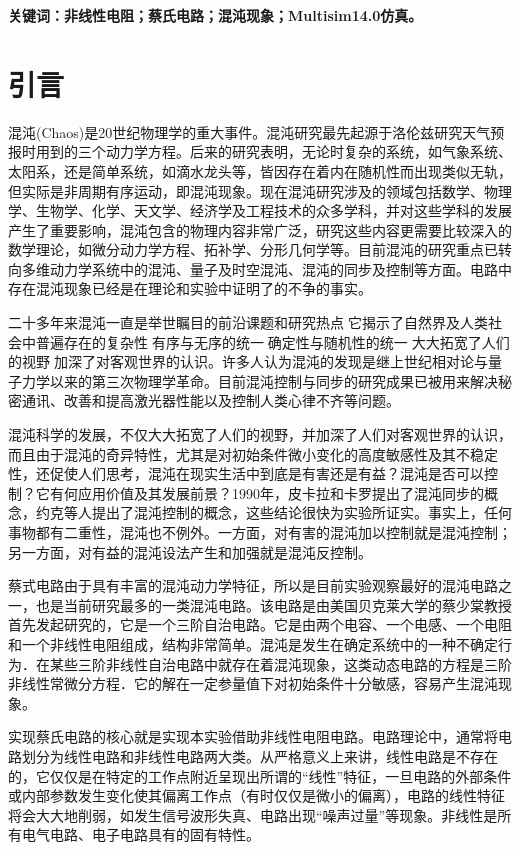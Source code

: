 \documentclass{article}
\begin{document}
\textbf{关键词：非线性电阻；蔡氏电路；混沌现象；Multisim14.0仿真。}

\newpage

\section{引言}%
\label{sec:引言}

混沌(Chaos)是20世纪物理学的重大事件。混沌研究最先起源于洛伦兹研究天气预报时用到的三个动力学方程。后来的研究表明，无论时复杂的系统，如气象系统、太阳系，还是简单系统，如滴水龙头等，皆因存在着内在随机性而出现类似无轨，但实际是非周期有序运动，即混沌现象。现在混沌研究涉及的领域包括数学、物理学、生物学、化学、天文学、经济学及工程技术的众多学科，并对这些学科的发展产生了重要影响，混沌包含的物理内容非常广泛，研究这些内容更需要比较深入的数学理论，如微分动力学方程、拓补学、分形几何学等。目前混沌的研究重点已转向多维动力学系统中的混沌、量子及时空混沌、混沌的同步及控制等方面。电路中存在混沌现象已经是在理论和实验中证明了的不争的事实。

二十多年来混沌一直是举世瞩目的前沿课题和研究热点它揭示了自然界及人类社会中普遍存在的复杂性有序与无序的统一确定性与随机性的统一大大拓宽了人们的视野加深了对客观世界的认识。许多人认为混沌的发现是继上世纪相对论与量子力学以来的第三次物理学革命。目前混沌控制与同步的研究成果已被用来解决秘密通讯、改善和提高激光器性能以及控制人类心律不齐等问题。

混沌科学的发展，不仅大大拓宽了人们的视野，并加深了人们对客观世界的认识，而且由于混沌的奇异特性，尤其是对初始条件微小变化的高度敏感性及其不稳定性，还促使人们思考，混沌在现实生活中到底是有害还是有益？混沌是否可以控制？它有何应用价值及其发展前景？1990年，皮卡拉和卡罗提出了混沌同步的概念，约克等人提出了混沌控制的概念，这些结论很快为实验所证实。事实上，任何事物都有二重性，混沌也不例外。一方面，对有害的混沌加以控制就是混沌控制；另一方面，对有益的混沌设法产生和加强就是混沌反控制。

蔡式电路由于具有丰富的混沌动力学特征，所以是目前实验观察最好的混沌电路之一，也是当前研究最多的一类混沌电路。该电路是由美国贝克莱大学的蔡少棠教授首先发起研究的，它是一个三阶自治电路。它是由两个电容、一个电感、一个电阻和一个非线性电阻组成，结构非常简单。混沌是发生在确定系统中的一种不确定行为．在某些三阶非线性自治电路中就存在着混沌现象，这类动态电路的方程是三阶非线性常微分方程．它的解在一定参量值下对初始条件十分敏感，容易产生混沌现象。

实现蔡氏电路的核心就是实现本实验借助非线性电阻电路。电路理论中，通常将电路划分为线性电路和非线性电路两大类。从严格意义上来讲，线性电路是不存在的，它仅仅是在特定的工作点附近呈现出所谓的“线性”特征，一旦电路的外部条件或内部参数发生变化使其偏离工作点（有时仅仅是微小的偏离），电路的线性特征将会大大地削弱，如发生信号波形失真、电路出现“噪声过量”等现象。非线性是所有电气电路、电子电路具有的固有特性。
\end{document}
